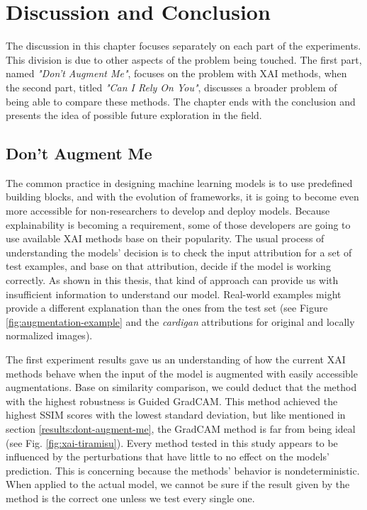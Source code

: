 \chapter{Discussion and Conclusion}\label{chapter:conclusion}
\thispagestyle{chapterBeginStyle}

\vspace{-15mm}
The discussion in this chapter focuses separately on each part of the experiments. This division is due to other aspects of the problem being touched. The first part, named \textit{"Don't Augment Me"}, focuses on the problem with XAI methods, when the second part, titled \textit{"Can I Rely On You"}, discusses a broader problem of being able to compare these methods. The chapter ends with the conclusion and presents the idea of possible future exploration in the field.

\section{Don't Augment Me}

The common practice in designing machine learning models is to use predefined building blocks, and with the evolution of frameworks, it is going to become even more accessible for non-researchers to develop and deploy models. Because explainability is becoming a requirement, some of those developers are going to use available XAI methods base on their popularity. The usual process of understanding the models' decision is to check the input attribution for a set of test examples, and base on that attribution, decide if the model is working correctly. As shown in this thesis, that kind of approach can provide us with insufficient information to understand our model. Real-world examples might provide a different explanation than the ones from the test set (see Figure \ref{fig:augmentation-example} and the \textit{cardigan} attributions for original and locally normalized images).

\vspace{\baselineskip}

The first experiment results gave us an understanding of how the current XAI methods behave when the input of the model is augmented with easily accessible augmentations. Base on similarity comparison, we could deduct that the method with the highest robustness is Guided GradCAM. This method achieved the highest SSIM scores with the lowest standard deviation, but like mentioned in section \ref{results:dont-augment-me}, the GradCAM method is far from being ideal (see Fig. \ref{fig:xai-tiramisu}). Every method tested in this study appears to be influenced by the perturbations that have little to no effect on the models' prediction. This is concerning because the methods' behavior is nondeterministic. When applied to the actual model, we cannot be sure if the result given by the method is the correct one unless we test every single one.

